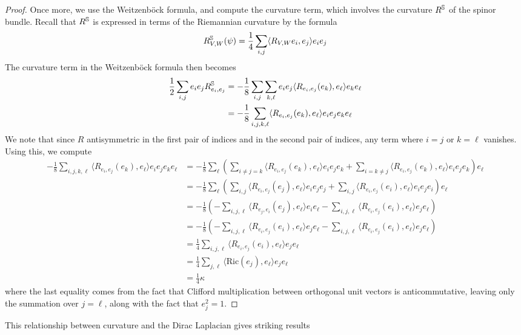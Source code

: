 %
\begin{proof} %
Once more, we use the Weitzenb\"ock formula, and compute the curvature term, which
involves the curvature $R^\S$ of the spinor bundle. Recall that $R^\S$ is expressed
in terms of the Riemannian curvature by the formula
\[
R^\S_{V,W}(\psi) = \frac{1}{4}\sum_{i, j}\langle R_{V,W}e_i, e_j \rangle e_ie_j
\]
The curvature term in the Weitzenb\"ock formula then becomes
\begin{align*}
\frac{1}{2}\sum_{i,j}e_ie_jR^\S_{e_i,e_j}
&= -\frac{1}{8}\sum_{i,j}\sum_{k,\ell}e_ie_j\langle R_{e_i, e_j}(e_k), e_\ell \rangle
e_ke_\ell \\
&= -\frac{1}{8}\sum_{i,j,k,\ell} \langle R_{e_i, e_j}(e_k), e_\ell \rangle
e_ie_je_ke_\ell
\end{align*}
We note that since $R$ antisymmetric in the first pair of indices and in the
second pair of indices, any term where $i = j$ or $k = \ell$ vanishes.
Using this, we compute
\begin{align*}
-\frac{1}{8}\sum_{i,j,k,\ell} \langle R_{e_i, e_j}(e_k), e_\ell \rangle e_ie_je_ke_\ell
&= -\frac{1}{8} \sum_\ell \left( \sum_{i \neq j = k}
\langle R_{e_i, e_j}(e_k), e_\ell \rangle e_ie_je_k + \sum_{i = k \neq j}  \langle
R_{e_i, e_j}(e_k), e_\ell \rangle e_ie_je_k\right)e_\ell \\
&= -\frac{1}{8}\sum_\ell \left( \sum_{i,j} \langle R_{e_i, e_j}(e_j), e_\ell \rangle
e_ie_je_j + \sum_{i,j} \langle R_{e_i, e_j}(e_i), e_\ell \rangle e_ie_je_i\right)
e_\ell \\
&= -\frac{1}{8} \left(-\sum_{i,j,\ell} \langle R_{e_j,e_i}(e_j), e_\ell \rangle
e_ie_\ell - \sum_{i,j,\ell} \langle R_{e_i, e_j}(e_i), e_\ell \rangle e_je_\ell\right) \\
&= -\frac{1}{8} \left(-\sum_{i,j,\ell} \langle R_{e_i,e_j}(e_i), e_\ell \rangle
e_je_\ell - \sum_{i,j,\ell} \langle R_{e_i, e_j}(e_i), e_\ell \rangle e_je_\ell\right) \\
&= \frac{1}{4} \sum_{i,j,\ell} \langle R_{e_i, e_j}(e_i), e_\ell \rangle e_je_\ell \\
&= \frac{1}{4} \sum_{j, \ell} \langle \mathrm{Ric}(e_j), e_\ell \rangle e_je_\ell \\
&= \frac{1}{4} \kappa
\end{align*}
where the last equality comes from the fact that Clifford multiplication between
orthogonal unit vectors is anticommutative, leaving only the summation over $j = \ell$,
along with the fact that $e_j^2 = 1$.
\end{proof}
%
This relationship between curvature and the Dirac Laplacian gives striking results
